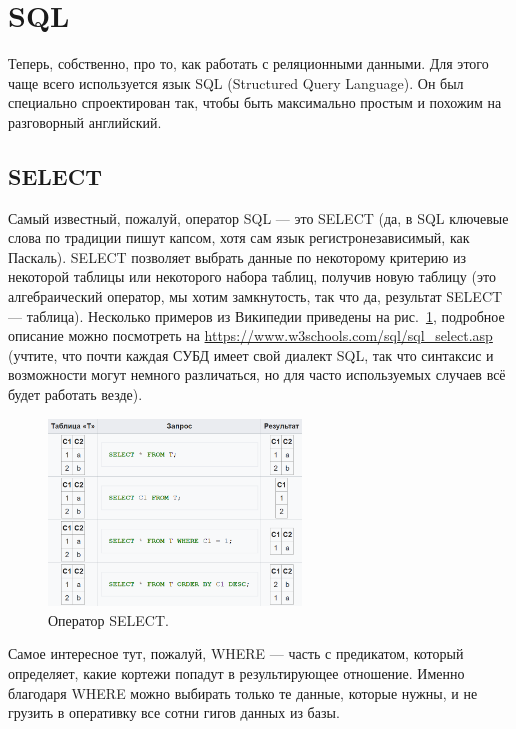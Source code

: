 \documentclass[a5paper]{article}
\begin{document}
\section{SQL}

Теперь, собственно, про то, как работать с реляционными данными. Для этого чаще всего используется язык SQL (Structured Query Language). Он был специально спроектирован так, чтобы быть максимально простым и похожим на разговорный английский. 

\subsection{SELECT}

Самый известный, пожалуй, оператор SQL --- это SELECT (да, в SQL ключевые слова по традиции пишут капсом, хотя сам язык регистронезависимый, как Паскаль). SELECT позволяет выбрать данные по некоторому критерию из некоторой таблицы или некоторого набора таблиц, получив новую таблицу (это алгебраический оператор, мы хотим замкнутость, так что да, результат SELECT --- таблица). Несколько примеров из Википедии приведены на рис.~\ref{image:select}, подробное описание можно посмотреть на \url{https://www.w3schools.com/sql/sql_select.asp} (учтите, что почти каждая СУБД имеет свой диалект SQL, так что синтаксис и возможности могут немного различаться, но для часто используемых случаев всё будет работать везде).

\begin{figure}
    \begin{center}
        \includegraphics[width=0.6\textwidth]{select.png}
    \end{center}
    \caption{Оператор SELECT.}
    \label{image:select}
\end{figure}

Самое интересное тут, пожалуй, WHERE --- часть с предикатом, который определяет, какие кортежи попадут в результирующее отношение. Именно благодаря WHERE можно выбирать только те данные, которые нужны, и не грузить в оперативку все сотни гигов данных из базы.
\end{document}
